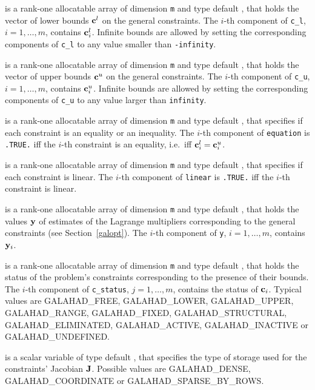 \documentclass{galahad}
\newcommand{\sym}{\sf\small}
\begin{document}
\begin{description}
 is a rank-one allocatable array of dimension {\tt m} and type 
default \realdp, that holds the vector of lower bounds ${\mathbf{c}}^{l}$ 
on the general constraints. The $i$-th component of 
{\tt c\_l}, $i = 1, \ldots , m$, contains ${\mathbf{c}}_{i}^{l}$.
Infinite bounds are allowed by setting the corresponding 
components of {\tt c\_l} to any value smaller than {\tt -infinity}. 

 is a rank-one allocatable array of dimension {\tt m} and type 
default \realdp, that holds the vector of upper bounds ${\mathbf{c}}^{u}$ 
on the general constraints. The $i$-th component of 
{\tt c\_u}, $i = 1,  \ldots ,  m$, contains ${\mathbf{c}}_{i}^{u}$.
Infinite bounds are allowed by setting the corresponding 
components of {\tt c\_u} to any value larger than {\tt infinity}.

 is a rank-one allocatable array of dimension {\tt m} and
type default \logical, that specifies if each constraint is an equality
or an inequality. The $i$-th component of {\tt equation} is {\tt .TRUE.}
iff the $i$-th constraint is an equality, i.e.\ iff ${\mathbf{c}}^l_i = {\mathbf{c}}^u_i$.

 is a rank-one allocatable array of dimension {\tt m} and
type default \logical, that specifies if each constraint is linear.
The $i$-th component of {\tt linear} is {\tt .TRUE.}
iff the $i$-th constraint is linear.

 is a rank-one allocatable array of dimension {\tt m} and type 
default \realdp, that holds
the values ${\mathbf{y}}$ of estimates  of the Lagrange multipliers
corresponding to the general constraints (see Section~\ref{galopt}).
The $i$-th component of {\tt y}, $i = 1,  \ldots ,  m$, contains ${\mathbf{y}}_{i}$.  

 is  a rank-one allocatable array of dimension {\tt m} and type 
default \integer, that holds the status of the problem's constraints
corresponding to the presence of their bounds. The $i$-th component of 
{\tt c\_status}, $j = 1,  \ldots ,  m$, contains the status of ${\mathbf{c}}_i$.
Typical values are
{\sym GALAHAD\_FREE},  {\sym GALAHAD\_LOWER}, {\sym GALAHAD\_UPPER},
{\sym GALAHAD\_RANGE}, {\sym GALAHAD\_FIXED}, {\sym GALAHAD\_STRUCTURAL},
{\sym GALAHAD\_ELIMINATED}, {\sym GALAHAD\_ACTIVE}, 
{\sym GALAHAD\_INACTIVE} or {\sym GALAHAD\_UNDEFINED}.
        
 is a scalar variable of type default \integer, 
that specifies the type of storage used for the 
constraints' Jacobian ${\mathbf{J}}$.
Possible values are {\sym GALAHAD\_DENSE}, {\sym GALAHAD\_COORDINATE} 
or {\sym GALAHAD\_SPARSE\_BY\_ROWS}.
              

\end{description}
\end{document}
